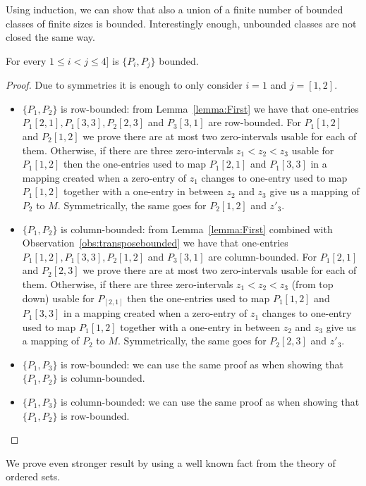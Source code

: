 Using induction, we can show that also a union of a finite number of bounded classes of finite sizes is bounded. Interestingly enough, unbounded classes are not closed the same way.

\begin{thm}
For every $1\leq i<j\leq4]$ is $\{P_i,P_j\}$ bounded.
\end{thm}
\begin{proof}
Due to symmetries it is enough to only consider $i=1$ and $j=[1,2]$.

\begin{itemize}
	\item $\{P_1,P_2\}$ is row-bounded: from Lemma~\ref{lemma:First} we have that one-entries $P_1[2,1],P_1[3,3],P_2[2,3]$ and $P_3[3,1]$ are row-bounded. For $P_1[1,2]$ and $P_2[1,2]$ we prove there are at most two zero-intervals usable for each of them. Otherwise, if there are three zero-intervals $z_1<z_2<z_3$ usable for $P_1[1,2]$ then the one-entries used to map $P_1[2,1]$ and $P_1[3,3]$ in a mapping created when a zero-entry of $z_1$ changes to one-entry used to map $P_1[1,2]$ together with a one-entry in between $z_2$ and $z_3$ give us a mapping of $P_2$ to $M$. Symmetrically, the same goes for $P_2[1,2]$ and $z'_3$.
	\item $\{P_1,P_2\}$ is column-bounded: from Lemma~\ref{lemma:First} combined with Observation~\ref{obs:transposebounded} we have that one-entries $P_1[1,2],P_1[3,3],P_2[1,2]$ and $P_3[3,1]$ are column-bounded. For $P_1[2,1]$ and $P_2[2,3]$ we prove there are at most two zero-intervals usable for each of them. Otherwise, if there are three zero-intervals $z_1<z_2<z_3$ (from top down) usable for $P_[2,1]$ then the one-entries used to map $P_1[1,2]$ and $P_1[3,3]$ in a mapping created when a zero-entry of $z_1$ changes to one-entry used to map $P_1[1,2]$ together with a one-entry in between $z_2$ and $z_3$ give us a mapping of $P_2$ to $M$. Symmetrically, the same goes for $P_2[2,3]$ and $z'_3$.
	\item $\{P_1,P_3\}$ is row-bounded: we can use the same proof as when showing that $\{P_1,P_2\}$ is column-bounded.
	\item $\{P_1,P_3\}$ is column-bounded: we can use the same proof as when showing that $\{P_1,P_2\}$ is row-bounded.
\end{itemize}
\end{proof}

We prove even stronger result by using a well known fact from the theory of ordered sets.

